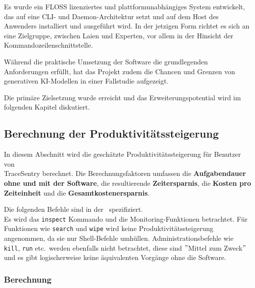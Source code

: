 \documentclass[a4paper,12pt]{report}
\begin{document}
    Es wurde ein FLOSS lizenziertes und plattformunabhängiges System entwickelt, das auf eine CLI- und Daemon-Architektur setzt und auf dem Host des Anwenders installiert und ausgeführt wird.
    In der jetzigen Form richtet es sich an eine Zielgruppe, zwischen Laien und Experten, vor allem in der Hinsicht der Kommandozeilenschnittstelle.

    Während die praktische Umsetzung der Software die grundlegenden Anforderungen erfüllt, hat das Projekt zudem die Chancen und Grenzen von generativen KI-Modellen in einer Fallstudie aufgezeigt.

    Die primäre Zielsetzung wurde erreicht und das Erweiterungspotential wird im folgenden Kapitel diskutiert.

    \subsection{Berechnung der Produktivitätssteigerung}\label{subsec:berechnung-der-produktivitatssteigerung}
    In diesem Abschnitt wird die geschätzte Produktivitätssteigerung für Benutzer von \\TraceSentry berechnet.
    Die Berechnungsfaktoren umfassen die \textbf{Aufgabendauer ohne und mit der Software}, die resultierende  \textbf{Zeitersparnis}, die  \textbf{Kosten pro Zeiteinheit} und die  \textbf{Gesamtkostenersparnis}.

    Die folgenden Befehle sind in der~ spezifiziert.
    \\Es wird das \texttt{inspect} Kommando und die Monitoring-Funktionen betrachtet.
    Für Funktionen wie \texttt{search} und \texttt{wipe} wird keine Produktivitätssteigerung angenommen, da sie nur Shell-Befehle umhüllen.
    Administrationsbefehle wie \texttt{kill}, \texttt{run} etc.\ werden ebenfalls nicht betrachtet, diese sind \("\)Mittel zum Zweck\("\) und es gibt logischerweise keine äquivalenten Vorgänge ohne die Software.

    \clearpage

    \subsubsection{Berechnung}
\end{document}
